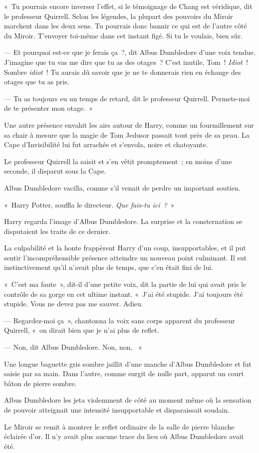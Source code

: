 «~Tu pourrais encore inverser l'effet, si le témoignage de Chang est véridique, dit le professeur Quirrell.
Selon les légendes, la plupart des pouvoirs du Miroir marchent dans les deux sens.
Tu pourrais donc bannir ce qui est de l'autre côté du Miroir.
T'envoyer toi-même dans cet instant figé.
Si tu le voulais, bien sûr.

--- Et pourquoi est-ce que je ferais ça~?, dit Albus Dumbledore d'une voix tendue.
J'imagine que tu vas me dire que tu as des otages~?
C'est inutile, Tom~!
\emph{Idiot}~!
Sombre \emph{idiot}~!
Tu aurais dû savoir que je ne te donnerais rien en échange des otages que tu as pris.

--- Tu as toujours eu un temps de retard, dit le professeur Quirrell.
Permets-moi de te présenter mon otage.~»

Une autre présence envahit les airs autour de Harry, comme un fourmillement sur sa chair à mesure que la magie de Tom Jedusor passait tout près de sa peau.
La Cape d'Invisibilité lui fut arrachée et s'envola, noire et chatoyante.

Le professeur Quirrell la saisit et s'en vêtit promptement~; en moins d'une seconde, il disparut sous la Cape.

Albus Dumbledore vacilla, comme s'il venait de perdre un important soutien.

«~Harry Potter, souffla le directeur.
\emph{Que fais-tu ici~?}~»

Harry regarda l'image d'Albus Dumbledore.
La surprise et la consternation se disputaient les traits de ce dernier.

La culpabilité et la honte frappèrent Harry d'un coup, insupportables, et il put sentir l'incompréhensible présence atteindre un nouveau point culminant.
Il sut instinctivement qu'il n'avait plus de temps, que c'en était fini de lui.

«~C'est ma faute~», dit-il d'une petite voix, dit la partie de lui qui avait pris le contrôle de sa gorge en cet ultime instant.
«~J'ai été stupide.
J'ai toujours été stupide.
Vous ne devez pas me sauver.
Adieu.

--- Regardez-moi ça~», chantonna la voix sans corps apparent du professeur Quirrell, «~on dirait bien que je n'ai plus de reflet.

--- Non, dit Albus Dumbledore.
Non, non, ~»~

Une longue baguette gris sombre jaillit d'une manche d'Albus Dumbledore et fut saisie par sa main.
Dans l'autre, comme surgit de nulle part, apparut un court bâton de pierre sombre.

Albus Dumbledore les jeta violemment de côté au moment même où la sensation de pouvoir atteignait une intensité insupportable et disparaissait soudain.

Le Miroir se remit à montrer le reflet ordinaire de la salle de pierre blanche éclairée d'or.
Il n'y avait plus aucune trace du lieu où Albus Dumbledore avait été.
